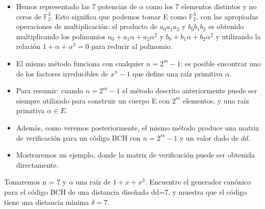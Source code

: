 \begin{frame}  \footnotesize 
\begin{itemize} 


\item  Hemos representado las 7 potencias de $\alpha$ como los 7 elementos distintos y no ceros de $\mathbb{F}_2^3$. Esto significa que podemos tomar E como $\mathbb{F}_2^3$, con las apropiadas operaciones de multiplicación: el producto de $a_0a_1a_2$ y $b_0b_1b_2$ es obtenido multiplicando los polinomios $a_0 + a_1 \alpha+ a_2 \alpha^2$ y  $b_0 + b_1 \alpha+ b_2 \alpha^2$ y utilizando la relación $1 + \alpha + \alpha^3 = 0$ para reducir al polinomio.

\item El mismo método funciona con cualquier $n=2^m -1$: es posible encontrar uno de los factores irreducibles de $x^n-1$ que define una raíz primitiva $\alpha$.  %

\item Para resumir: cuando $n=2^m-1$ el método descrito anteriormente puede ser siempre utilizado para construir un cuerpo E con $2^m$ elementos, y una raíz primitiva $\alpha \in E$. 

\item Además, como veremos posteriormente, el mismo método produce una matriz de verificación para un código BCH con $n=2^m-1$ y un valor dado de $dd$.

\item Mostraremos un ejemplo, donde la matriz de verificación puede ser obtenida directamente.


\end{itemize} \end{frame} 


\begin{frame}  \small  

\begin{ejemplo}

Tomaremos n = 7 y $\alpha$ una raíz de $1+x+x^3$. Encuentre el generador canónico para el código BCH de una distancia diseñada dd=7, y muestra que el código tiene una distancia mínima $\delta=7$.\\
\end{ejemplo}

\end{frame} 

